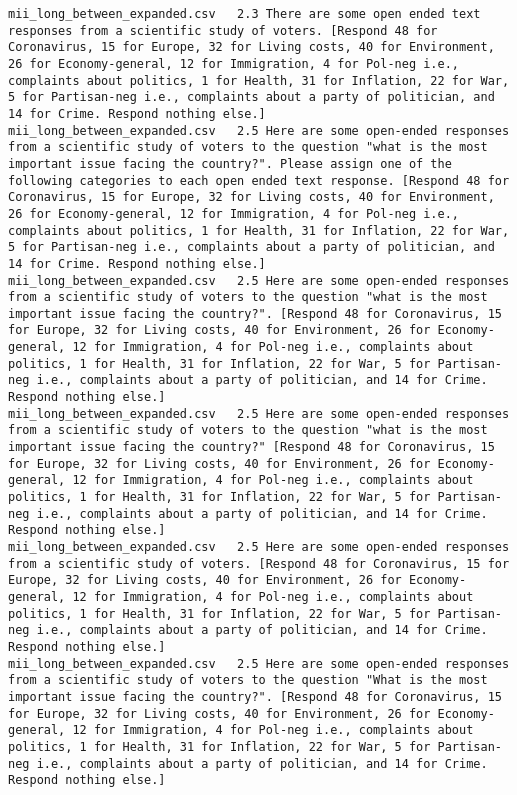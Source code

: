 \begin{lstlisting}[label=lst:promptvariants]
mii_long_between_expanded.csv	2.3	There are some open ended text responses from a scientific study of voters. [Respond 48 for Coronavirus, 15 for Europe, 32 for Living costs, 40 for Environment, 26 for Economy-general, 12 for Immigration, 4 for Pol-neg i.e., complaints about politics, 1 for Health, 31 for Inflation, 22 for War, 5 for Partisan-neg i.e., complaints about a party of politician, and 14 for Crime. Respond nothing else.]
mii_long_between_expanded.csv	2.5	Here are some open-ended responses from a scientific study of voters to the question "what is the most important issue facing the country?". Please assign one of the following categories to each open ended text response. [Respond 48 for Coronavirus, 15 for Europe, 32 for Living costs, 40 for Environment, 26 for Economy-general, 12 for Immigration, 4 for Pol-neg i.e., complaints about politics, 1 for Health, 31 for Inflation, 22 for War, 5 for Partisan-neg i.e., complaints about a party of politician, and 14 for Crime. Respond nothing else.]
mii_long_between_expanded.csv	2.5	Here are some open-ended responses from a scientific study of voters to the question "what is the most important issue facing the country?". [Respond 48 for Coronavirus, 15 for Europe, 32 for Living costs, 40 for Environment, 26 for Economy-general, 12 for Immigration, 4 for Pol-neg i.e., complaints about politics, 1 for Health, 31 for Inflation, 22 for War, 5 for Partisan-neg i.e., complaints about a party of politician, and 14 for Crime. Respond nothing else.]
mii_long_between_expanded.csv	2.5	Here are some open-ended responses from a scientific study of voters to the question "what is the most important issue facing the country?" [Respond 48 for Coronavirus, 15 for Europe, 32 for Living costs, 40 for Environment, 26 for Economy-general, 12 for Immigration, 4 for Pol-neg i.e., complaints about politics, 1 for Health, 31 for Inflation, 22 for War, 5 for Partisan-neg i.e., complaints about a party of politician, and 14 for Crime. Respond nothing else.]
mii_long_between_expanded.csv	2.5	Here are some open-ended responses from a scientific study of voters. [Respond 48 for Coronavirus, 15 for Europe, 32 for Living costs, 40 for Environment, 26 for Economy-general, 12 for Immigration, 4 for Pol-neg i.e., complaints about politics, 1 for Health, 31 for Inflation, 22 for War, 5 for Partisan-neg i.e., complaints about a party of politician, and 14 for Crime. Respond nothing else.]
mii_long_between_expanded.csv	2.5	Here are some open-ended responses from a scientific study of voters to the question "What is the most important issue facing the country?". [Respond 48 for Coronavirus, 15 for Europe, 32 for Living costs, 40 for Environment, 26 for Economy-general, 12 for Immigration, 4 for Pol-neg i.e., complaints about politics, 1 for Health, 31 for Inflation, 22 for War, 5 for Partisan-neg i.e., complaints about a party of politician, and 14 for Crime. Respond nothing else.]

\end{lstlisting}
